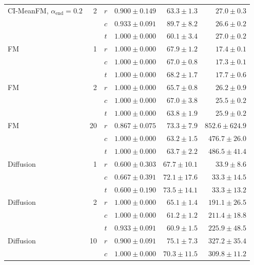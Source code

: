 \begin{table}[htpb]
\begin{tabularx}{\linewidth}{@{}L r c rrr@{}}
    CI-MeanFM, $\alpha_{\mathrm{end}}=0.2$ & 2 & $r$ & $0.900 \pm 0.149$ & $63.3 \pm 1.3$ & $27.0 \pm 0.3$ \\
                     &    & $c$ & $0.933 \pm 0.091$ & $89.7 \pm 8.2$ & $26.6 \pm 0.2$ \\
                     &    & $t$ & $1.000 \pm 0.000$ & $60.1 \pm 3.4$ & $27.0 \pm 0.2$ \\
    \midrule
    FM         & 1 & $r$ & $1.000 \pm 0.000$ & $67.9 \pm 1.2$ & $17.4 \pm 0.1$ \\
                     &    & \textbf{$c$} & \textbf{$1.000 \pm 0.000$} & \textbf{$67.0 \pm 0.8$} & \textbf{$17.3 \pm 0.1$} \\
                     &    & $t$ & $1.000 \pm 0.000$ & $68.2 \pm 1.7$ & $17.7 \pm 0.6$ \\
    FM         & 2 & $r$ & $1.000 \pm 0.000$ & $65.7 \pm 0.8$ & $26.2 \pm 0.9$ \\
                     &    & $c$ & $1.000 \pm 0.000$ & $67.0 \pm 3.8$ & $25.5 \pm 0.2$ \\
                     &    & $t$ & $1.000 \pm 0.000$ & $63.8 \pm 1.9$ & $25.9 \pm 0.2$ \\
    FM         & 20 & $r$ & $0.867 \pm 0.075$ & $73.3 \pm 7.9$ & $852.6 \pm 624.9$ \\
                     &    & $c$ & $1.000 \pm 0.000$ & $63.2 \pm 1.5$ & $476.7 \pm 26.0$ \\
                     &    & $t$ & $1.000 \pm 0.000$ & $63.7 \pm 2.2$ & $486.5 \pm 41.4$ \\
    \midrule
    Diffusion  & 1 & $r$ & $0.600 \pm 0.303$ & $67.7 \pm 10.1$ & $33.9 \pm 8.6$ \\
                     &    & $c$ & $0.667 \pm 0.391$ & $72.1 \pm 17.6$ & $33.3 \pm 14.5$ \\
                     &    & $t$ & $0.600 \pm 0.190$ & $73.5 \pm 14.1$ & $33.3 \pm 13.2$ \\
    Diffusion  & 2 & \textbf{$r$} & \textbf{$1.000 \pm 0.000$} & \textbf{$65.1 \pm 1.4$} & \textbf{$191.1 \pm 26.5$} \\
                     &    & \textbf{$c$} & \textbf{$1.000 \pm 0.000$} & \textbf{$61.2 \pm 1.2$} & \textbf{$211.4 \pm 18.8$} \\
                     &    & $t$ & $0.933 \pm 0.091$ & $60.9 \pm 1.5$ & $225.9 \pm 48.5$ \\
    Diffusion  & 10 & $r$ & $0.900 \pm 0.091$ & $75.1 \pm 7.3$ & $327.2 \pm 35.4$ \\
                     &    & $c$ & $1.000 \pm 0.000$ & $70.3 \pm 11.5$ & $309.8 \pm 11.2$ \\

\end{tabularx}
\end{table}
